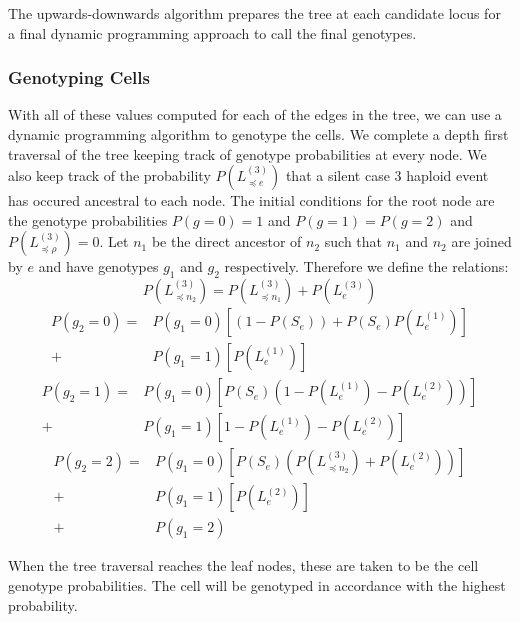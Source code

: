 \documentclass[../../main.tex]{subfiles}
\begin{document}
The upwards-downwards algorithm prepares the tree at each candidate locus for a final dynamic programming approach to call the final genotypes.

\subsubsection*{Genotyping Cells}
With all of these values computed for each of the edges in the tree, we can use a dynamic programming algorithm to genotype the cells. We complete a depth first traversal of the tree keeping track of genotype probabilities at every node. We also keep track of the probability $P(L_{\preceq e}^{(3)})$ that a silent case 3 haploid event has occured ancestral to each node. The initial conditions for the root node are the genotype probabilities $P(g=0)=1$ and $P(g=1)=P(g=2)$ and $P(L_{\preceq \rho}^{(3)}) = 0$. Let $n_1$ be the direct ancestor of $n_2$ such that $n_1$ and $n_2$ are joined by $e$ and have genotypes $g_1$ and $g_2$ respectively. Therefore we define the relations:
\begin{equation*}
P(L^{(3)}_{\preceq n_2}) = P(L^{(3)}_{\preceq n_1}) +P(L^{(3)}_e)
\end{equation*}
\begin{align*}
P(g_2 = 0) = &P(g_1=0)\left[(1-P(S_e))+P(S_e)P(L^{(1)}_e)\right]\\
+ &P(g_1 = 1)\left[P(L^{(1)}_e)\right]
\end{align*}
\begin{align*}
P(g_2 = 1) = &P(g_1=0)\left[P(S_e)(1-P(L^{(1)}_e)-P(L^{(2)}_e))\right]\\
+ &P(g_1 = 1)\left[1-P(L^{(1)}_e)-P(L^{(2)}_e)\right]
\end{align*}
\begin{align*}
P(g_2=2) = &P(g_1=0)\left[P(S_e)(P(L^{(3)}_{\preceq n_2}) + P(L^{(2)}_e))\right]\\
+ &P(g_1=1)\left[P(L^{(2)}_e)\right]\\
+ &P(g_1=2)
\end{align*}

When the tree traversal reaches the leaf nodes, these are taken to be the cell genotype probabilities. The cell will be genotyped in accordance with the highest probability.
\end{document}
